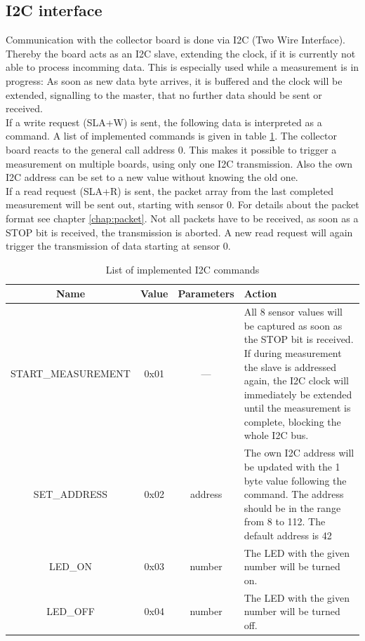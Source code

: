 \documentclass[a4paper]{scrreprt}
\begin{document}
\subsection{I2C interface}
Communication with the collector board is done via I2C (Two Wire Interface). Thereby the board acts as an
I2C slave, extending the clock, if it is currently not able to process incomming data.
This is especially used while a measurement is in progress: As soon as new data byte arrives,
it is buffered and the clock will be extended, signalling to the master, that no further data should be sent or received.\\
If a write request (SLA+W) is sent, the following data is interpreted as a command. A list of implemented commands is given
in table \ref{tab:i2c}. The collector board reacts to the general call address 0. This makes it possible to trigger a measurement
on multiple boards, using only one I2C transmission.
Also the own I2C address can be set to a new value without knowing the old one.\\
If a read request (SLA+R) is sent, the packet array from the last completed measurement will be sent out, starting with sensor 0.
For details about the packet format see chapter \ref{chap:packet}. Not all packets have to be received, as soon as a STOP bit is
received, the transmission is aborted. A new read request will again trigger the transmission of data starting at sensor 0.
\begin{table}[Hh!]
	\centering
	\begin{tabularx}{\textwidth}{ | c | c | c | X | }
		\hline
    Name & Value & Parameters & Action\\
		\hline
		\hline
    START\_MEASUREMENT & 0x01 & --- & All 8 sensor values will be
    captured as soon as the STOP bit is received. If during
    measurement
		the slave is addressed again, the I2C clock will immediately be extended until the measurement is complete, blocking the whole I2C bus.\\
		\hline
    SET\_ADDRESS & 0x02 & address & The own I2C address will be updated with the 1 byte value following the command. The address should
		be in the range from 8 to 112. The default address is 42\\
		\hline
    LED\_ON & 0x03 & number & The LED with the given number will be turned on.\\
		\hline
    LED\_OFF & 0x04 & number & The LED with the given number will be turned off.\\
		\hline
	\end{tabularx}
	\caption{List of implemented I2C commands}
	\label{tab:i2c}
\end{table}
\end{document}
